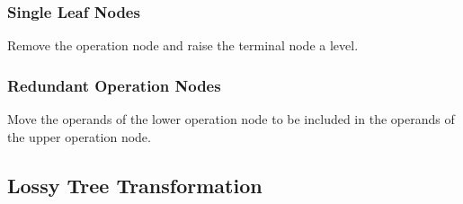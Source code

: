 \documentclass[letterpaper, 10pt, conference]{ieeeconf}   %
\begin{document}
		
\subsubsection{Single Leaf Nodes}
Remove the operation node and raise the terminal node a level.
	
\subsubsection{Redundant Operation Nodes}
Move the operands of the lower operation node to be included in the operands of
the upper operation node.

\subsection{Lossy Tree Transformation}
\end{document}
